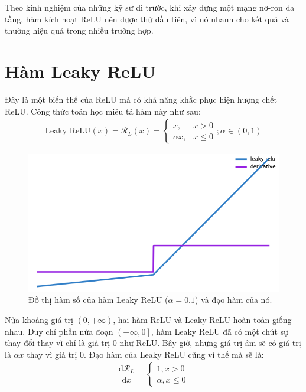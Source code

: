 Theo kinh nghiệm của những kỹ sư đi trước, khi xây dựng một mạng nơ-ron đa tầng, hàm kích hoạt ReLU nên được thử đầu tiên, vì nó nhanh cho kết quả và thường hiệu quả trong nhiều trường hợp.

\section{Hàm Leaky ReLU}\label{sec:hamleakyrelu}

Đây là một biến thể của ReLU \cite{leakyandrew} mà có khả năng khắc phục hiện hượng chết ReLU.
Công thức toán học miêu tả hàm này như sau:
\begin{align}
    \text{Leaky ReLU}(x) = \mathcal{R}_L(x) = \begin{cases}x, &x > 0\\\alpha x, &x \le 0\end{cases}; \alpha \in \left(0, 1\right)
\end{align}

\begin{figure}[!h]
\captionsetup{width=0.8\textwidth}
\centering
\includegraphics[width=15cm]{images/lrelu.PNG}
\caption{Đồ thị hàm số của hàm Leaky ReLU ($\alpha = 0.1$) và đạo hàm của nó.}
\label{fig:lrelu}
\end{figure}

Nửa khoảng giá trị $\left(0, +\infty\right)$, hai hàm ReLU và Leaky ReLU hoàn toàn giống nhau.
Duy chỉ phần nửa đoạn $\left(-\infty, 0\right]$, hàm Leaky ReLU đã có một chút sự thay đổi thay vì chỉ là giá trị 0 như ReLU.
Bây giờ, những giá trị âm sẽ có giá trị là $\alpha x$ thay vì giá trị $0$.
Đạo hàm của Leaky ReLU cũng vì thế mà sẽ là:
\begin{align}
    \dfrac{\text{d}\mathcal{R}_L}{\text{d}x} =  \begin{cases}1, x > 0\\\alpha, x \le 0\end{cases}
\end{align}

